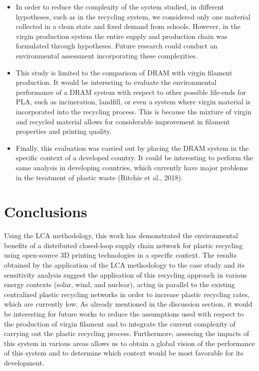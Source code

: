 \documentclass[]{elsarticle} %
\providecommand{\tightlist}{%
  \setlength{\itemsep}{0pt}\setlength{\parskip}{0pt}}
\begin{document}
\begin{itemize}
\tightlist
\item
  In order to reduce the complexity of the system studied, in different hypotheses, such as in the recycling system, we considered only one material collected in a clean state and fixed demand from schools. However, in the virgin production system the entire supply and production chain was formulated through hypotheses. Future research could conduct an environmental assessment incorporating these complexities.
\item
  This study is limited to the comparison of DRAM with virgin filament production. It would be interesting to evaluate the environmental performance of a DRAM system with respect to other possible life-ends for PLA, such as incineration, landfill, or even a system where virgin material is incorporated into the recycling process. This is because the mixture of virgin and recycled material allows for considerable improvement in filament properties and printing quality.
\item
  Finally, this evaluation was carried out by placing the DRAM system in the specific context of a developed country. It could be interesting to perform the same analysis in developing countries, which currently have major problems in the treatment of plastic waste (Ritchie et al., 2018).
\end{itemize}

\hypertarget{conclusions}{%
\section{Conclusions}\label{conclusions}}

Using the LCA methodology, this work has demonstrated the environmental benefits of a distributed closed-loop supply chain network for plastic recycling using open-source 3D printing technologies in a specific context.
The results obtained by the application of the LCA methodology to the case study and its sensitivity analysis suggest the application of this recycling approach in various energy contexts (solar, wind, and nuclear), acting in parallel to the existing centralized plastic recycling networks in order to increase plastic recycling rates, which are currently low.
As already mentioned in the discussion section, it would be interesting for future works to reduce the assumptions used with respect to the production of virgin filament and to integrate the current complexity of carrying out the plastic recycling process. Furthermore, assessing the impacts of this system in various areas allows us to obtain a global vision of the performance of this system and to determine which context would be most favorable for its development.
\end{document}
